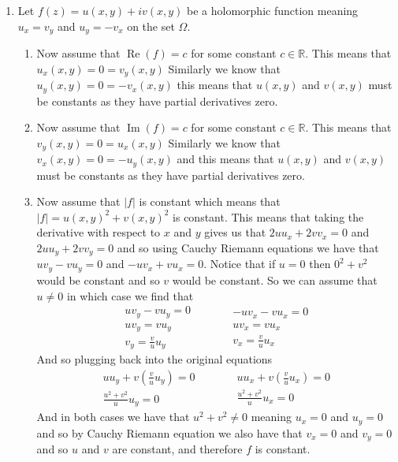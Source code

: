 \documentclass[12pt]{amsart}
\theoremstyle{definition}
\newcommand{\R}{\mathbb{R}}
\DeclareMathOperator{\Real}{\mathrm{Re}}
\DeclareMathOperator{\Imag}{\mathrm{Im}}
\begin{document}
\begin{enumerate}
\item  Let $f(z)=u(x,y)+iv(x,y)$ be a holomorphic function meaning $u_x=v_y$ and $u_y=-v_x$ on the set $\Omega$.\\ 
\begin{enumerate}
    \item Now assume that $\Real(f)=c$ for some constant $c\in \R$. This means that $u_x(x,y)=0=v_y(x,y)$ Similarly we know that $u_y(x,y)=0=-v_x(x,y)$ this means that $u(x,y)$ and $v(x,y)$ must be constants as they have partial derivatives zero.\\
    \item Now assume that $\Imag(f)=c$ for some constant $c\in \R$. This means that $v_y(x,y)=0=u_x(x,y)$ Similarly we know that $v_x(x,y)=0=-u_y(x,y)$ and this means that $u(x,y)$ and $v(x,y)$ must be constants as they have partial derivatives zero.\\
    \item Now assume that $|f|$ is constant which means that $|f|=u(x,y)^2+v(x,y)^2$ is constant. This means that taking the derivative with respect to $x$ and $y$ gives us that $2uu_x+2vv_x=0$ and $2uu_y+2vv_y=0$ and so using Cauchy Riemann equations we have that $uv_y-vu_y=0$ and $-uv_x+vu_x=0$. Notice that if $u=0$ then $0^2+v^2$ would be constant and so $v$ would be constant. So we can assume that $u\neq 0$ in which case we find that
    \begin{equation*}
      \begin{split}
      uv_y-vu_y=0\\
      uv_y=vu_y\\
      v_y=\frac{v}{u}u_y
      \end{split}
    \quad\quad\quad
      \begin{split}
        -uv_x-vu_x=0\\
      uv_x=vu_x\\
      v_x=\frac{v}{u}u_x
      \end{split}
    \end{equation*}
    And so plugging back into the original equations
    \begin{equation*}
      \begin{split}
      uu_y+v(\frac{v}{u}u_y)=0\\
      \frac{u^2+v^2}{u}u_y=0
      \end{split}
    \quad\quad\quad
      \begin{split}
       uu_x+v(\frac{v}{u}u_x)=0\\
      \frac{u^2+v^2}{u}u_x=0
      \end{split}
    \end{equation*}
And in both cases we have that $u^2+v^2\neq 0$ meaning $u_x=0$ and $u_y=0$ and so by Cauchy Riemann equation we also have that $v_x=0$ and $v_y=0$ and so $u$ and $v$ are constant, and therefore $f$ is constant.\\ 
\end{enumerate}


\end{enumerate}
\end{document}
